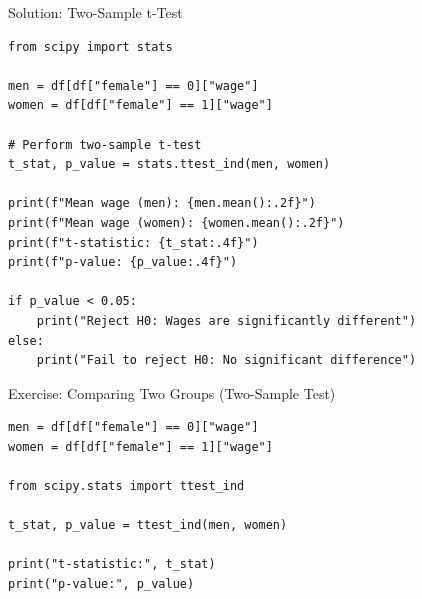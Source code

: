 \documentclass{beamer}
\begin{document}



%







\begin{frame}[fragile]{Solution: Two-Sample t-Test}

\begin{verbatim}
from scipy import stats

men = df[df["female"] == 0]["wage"]
women = df[df["female"] == 1]["wage"]

# Perform two-sample t-test
t_stat, p_value = stats.ttest_ind(men, women)

print(f"Mean wage (men): {men.mean():.2f}")
print(f"Mean wage (women): {women.mean():.2f}")
print(f"t-statistic: {t_stat:.4f}")
print(f"p-value: {p_value:.4f}")

if p_value < 0.05:
    print("Reject H0: Wages are significantly different")
else:
    print("Fail to reject H0: No significant difference")
\end{verbatim}
    
\end{frame}
\begin{frame}[fragile]{Exercise: Comparing Two Groups (Two-Sample Test)}

\begin{verbatim}
men = df[df["female"] == 0]["wage"]
women = df[df["female"] == 1]["wage"]

from scipy.stats import ttest_ind

t_stat, p_value = ttest_ind(men, women)

print("t-statistic:", t_stat)
print("p-value:", p_value)
\end{verbatim}
    
\end{frame}
\end{document}
